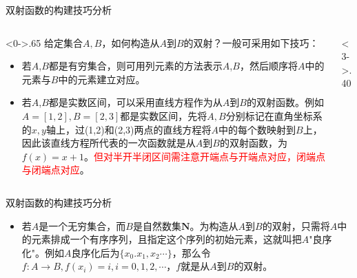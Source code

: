 \documentclass[10pt,aspectratio=43,mathserif,table]{beamer}
\begin{document}
\begin{frame}{双射函数的构建技巧分析}
	\begin{columns}[T] %
		\begin{column}<0->{.65\textwidth}
			给定集合$A,B$，如何构造从$A$到$B$的双射？一般可采用如下技巧：
			\begin{itemize}
				\item<2-> 若$A$,$B$都是有穷集合，则可用列元素的方法表示$A$,$B$，然后顺序将$A$中的元素与$B$中的元素建立对应。
				\item<3-> 若$A$,$B$都是实数区间，可以采用直线方程作为从$A$到$B$的双射函数。例如$A=[1,2],B=[2,3]$都是实数区间，先将$A,B$分别标记在直角坐标系的$x,y$轴上，过(1,2)和(2,3)两点的直线方程将$A$中的每个数映射到$B$上，因此该直线方程所代表的一次函数就是从$A$到$B$的双射函数，为$f(x)=x+1$。\textcolor{red}{但对半开半闭区间需注意开端点与开端点对应，闭端点与闭端点对应}。
			\end{itemize}
		\end{column}
		\begin{column}<3->{.40\textwidth}
			\begin{figure}
			\end{figure}
		\end{column}
	\end{columns}
\end{frame}

\begin{frame}{双射函数的构建技巧分析}
	\begin{itemize}
		\item<1-> 若$A$是一个无穷集合，而$B$是自然数集$\mathbf{N}$。为构造从$A$到$B$的双射，只需将$A$中的元素排成一个有序序列，且指定这个序列的初始元素，这就叫把$A$"良序化"。例如$A$良序化后为$\{x_{0}.x_{1},x_{2}\cdots\}$，那么令$f:A\rightarrow B,f(x_{i})=i,i=0,1,2,\cdots$，$f$就是从$A$到$B$的双射。
	\end{itemize}
\end{frame}
\end{document}
